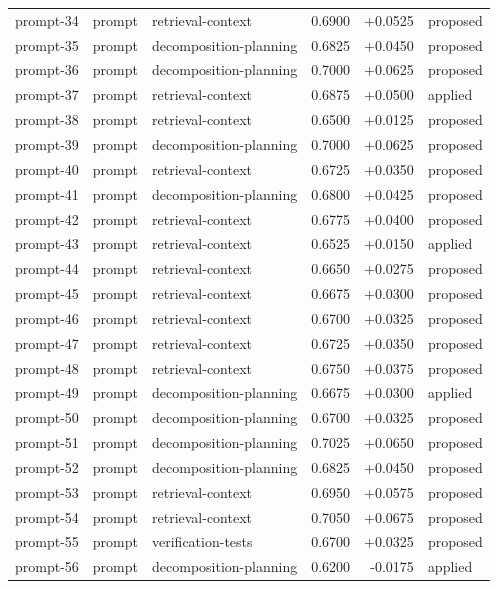 \begin{center}
\begin{longtable}{llp{5.2cm}rrl}
prompt-34 & prompt & retrieval-context & 0.6900 & +0.0525 & proposed \\
prompt-35 & prompt & decomposition-planning & 0.6825 & +0.0450 & proposed \\
prompt-36 & prompt & decomposition-planning & 0.7000 & +0.0625 & proposed \\
prompt-37 & prompt & retrieval-context & 0.6875 & +0.0500 & applied \\
prompt-38 & prompt & retrieval-context & 0.6500 & +0.0125 & proposed \\
prompt-39 & prompt & decomposition-planning & 0.7000 & +0.0625 & proposed \\
prompt-40 & prompt & retrieval-context & 0.6725 & +0.0350 & proposed \\
prompt-41 & prompt & decomposition-planning & 0.6800 & +0.0425 & proposed \\
prompt-42 & prompt & retrieval-context & 0.6775 & +0.0400 & proposed \\
prompt-43 & prompt & retrieval-context & 0.6525 & +0.0150 & applied \\
prompt-44 & prompt & retrieval-context & 0.6650 & +0.0275 & proposed \\
prompt-45 & prompt & retrieval-context & 0.6675 & +0.0300 & proposed \\
prompt-46 & prompt & retrieval-context & 0.6700 & +0.0325 & proposed \\
prompt-47 & prompt & retrieval-context & 0.6725 & +0.0350 & proposed \\
prompt-48 & prompt & retrieval-context & 0.6750 & +0.0375 & proposed \\
prompt-49 & prompt & decomposition-planning & 0.6675 & +0.0300 & applied \\
prompt-50 & prompt & decomposition-planning & 0.6700 & +0.0325 & proposed \\
prompt-51 & prompt & decomposition-planning & 0.7025 & +0.0650 & proposed \\
prompt-52 & prompt & decomposition-planning & 0.6825 & +0.0450 & proposed \\
prompt-53 & prompt & retrieval-context & 0.6950 & +0.0575 & proposed \\
prompt-54 & prompt & retrieval-context & 0.7050 & +0.0675 & proposed \\
prompt-55 & prompt & verification-tests & 0.6700 & +0.0325 & proposed \\
prompt-56 & prompt & decomposition-planning & 0.6200 & -0.0175 & applied \\

\end{longtable}
\end{center}
